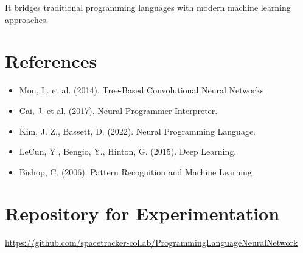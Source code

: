\documentclass[12pt]{article}
\begin{document}
It bridges traditional programming languages with modern machine learning approaches.

\section{References}

\begin{itemize}
\item Mou, L. et al. (2014). Tree-Based Convolutional Neural Networks.
\item Cai, J. et al. (2017). Neural Programmer-Interpreter.
\item Kim, J. Z., Bassett, D. (2022). Neural Programming Language.
\item LeCun, Y., Bengio, Y., Hinton, G. (2015). Deep Learning.
\item Bishop, C. (2006). Pattern Recognition and Machine Learning.
\end{itemize}

\section{Repository for Experimentation}

\noindent
\url{https://github.com/spacetracker-collab/ProgrammingLanguageNeuralNetwork}
\end{document}
